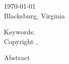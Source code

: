\documentclass[12pt]{report}
\renewcommand\[{\begin{equation}}
\renewcommand\]{\end{equation}}
\begin{document}
\thispagestyle{empty}


\begin{center}

{\Large
\mytitle
}


\vfill


\myauthor


\vfill


\mycommittee


\vfill


\ifx\mydate\undefined
\def\mydate{\today}
\fi
\mydate \\
\ifx\mydefenselocation\undefined
Blacksburg, Virginia
\else
\fi


\vfill

\ifx\myyear\undefined
\def\myyear{\the\year}
\fi

Keywords: \mykeywords \\
Copyright \myyear, \myauthor


\end{center}


\pagebreak


\thispagestyle{empty}

\begin{center}


{\large \mytitle}


\vfill


\myauthor


\vfill


Abstract


\vfill


\end{center}

\ifdefined \myabstract

\fi

\ifx\mygrants\undefined
\else
  \mygrants
\fi

\pagebreak


\tableofcontents

\pagebreak


\listoffigures

\pagebreak


\listoftables

\pagebreak

\ifdefined\myglossary

\printglossaries
\pagebreak
\fi


\pagestyle{myheadings}

\ifx\mylinespace\undefined
\else
  \mylinespace
\fi
\end{document}
